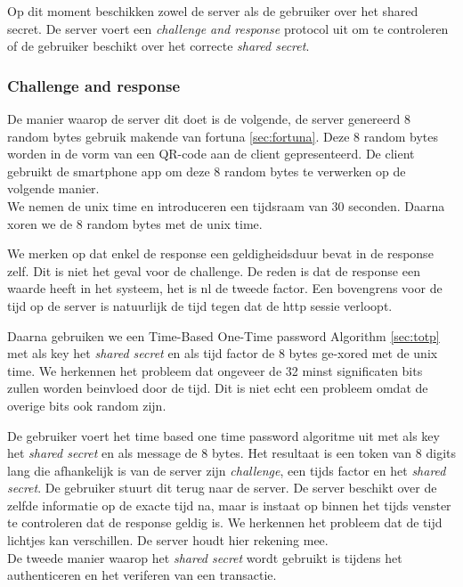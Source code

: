 \documentclass[11pt]{article}
\begin{document}
Op dit moment beschikken zowel de server als de gebruiker over het shared secret. De server voert een \emph{challenge and response} protocol uit om te controleren of de gebruiker beschikt over het correcte \emph{shared secret}.\\

\subsubsection{Challenge and response}
De manier waarop de server dit doet is de volgende, de server genereerd 8 random bytes gebruik makende van fortuna \ref{sec:fortuna}. Deze 8 random bytes worden in de vorm van een QR-code aan de client gepresenteerd. De client gebruikt de smartphone app om deze 8 random bytes te verwerken op de volgende manier.\\

We nemen de unix time en introduceren een tijdsraam van 30 seconden. Daarna xoren we de 8 random bytes met de unix time.

We merken op dat enkel de response een geldigheidsduur bevat in de response zelf. Dit is niet het geval voor de challenge. De reden is dat de response een waarde heeft in het systeem, het is nl de tweede factor. Een bovengrens voor de tijd op de server is natuurlijk de tijd tegen dat de http sessie verloopt.

Daarna gebruiken we een Time-Based One-Time password Algorithm \ref{sec:totp} met als key het \emph{shared secret} en als tijd factor de 8 bytes ge-xored met de unix time. We herkennen het probleem dat ongeveer de 32 minst significaten bits zullen worden beinvloed door de tijd. Dit is niet echt een probleem omdat de overige bits ook random zijn.

De gebruiker voert het time based one time password algoritme uit met als key het \emph{shared secret} en als message de 8 bytes. Het resultaat is een token van 8 digits lang die afhankelijk is van de server zijn \emph{challenge}, een tijds factor en het \emph{shared secret}. De gebruiker stuurt dit terug naar de server. De server beschikt over de zelfde informatie op de exacte tijd na, maar is instaat op binnen het tijds venster te controleren dat de response geldig is. We herkennen het probleem dat de tijd lichtjes kan verschillen. De server houdt hier rekening mee.\\

De tweede manier waarop het \emph{shared secret} wordt gebruikt is tijdens het authenticeren en het veriferen van een transactie.
\end{document}
